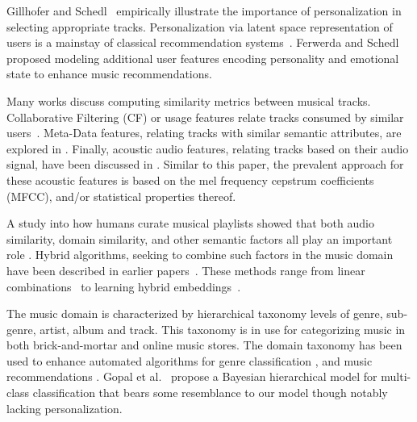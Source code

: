 Gillhofer and Schedl~\cite{Gillhofer2015} empirically illustrate the importance of personalization in selecting appropriate tracks. Personalization via latent space representation of users is a mainstay of classical recommendation systems~\cite{KorenBV09}. Ferwerda and Schedl~\cite{personalized_playlist_schedl} proposed modeling additional user features encoding personality and emotional state to enhance music recommendations.


Many works discuss computing similarity metrics between musical tracks. Collaborative Filtering (CF) or usage features relate tracks consumed by similar users~\cite{item2vec,Dror2011,Mcfee_learningsimilarity_CF}. Meta-Data features, relating tracks with similar semantic attributes, are explored in \cite{Bogdanov_content,  McfeeEtAl_2009_HeteEmbeForSubj, Pauws:ISMIR02,SlaneyEtAl_2008_LearAMetrFor}. Finally, acoustic audio features, relating tracks based on their audio signal, have been discussed in \cite{DoplerEtAl_2008_AcceMusiCollVia, Lee2011,a2mf}. Similar to this paper, the prevalent approach for these acoustic features is based on the mel frequency cepstrum coefficients (MFCC), and/or statistical properties thereof.

A study into how humans curate musical playlists showed that both audio similarity, domain similarity, and other semantic factors all play an important role \cite{Cunningham:06}. 
Hybrid algorithms, seeking to combine such factors in the music domain have been described in earlier papers~\cite{Knees:2006, Mcfee_learningsimilarity_CF,McFee_multi_similarities,Schedl:2015}. These methods range from linear combinations~\cite{Knees:2006} to learning hybrid embeddings~\cite{McFee_multi_similarities}.


The music domain is characterized by hierarchical taxonomy levels of genre, sub-genre, artist, album and track. This taxonomy is in use for categorizing music in both brick-and-mortar and online music stores. The domain taxonomy has been used to enhance automated algorithms for genre classification \cite{DecoroEtAl_2007_BayeAggrForHier}, and music recommendations \cite{Dror2011,Mnih2012}.
Gopal et al.~\cite{NIPS2012_4609} propose a Bayesian hierarchical model for multi-class classification that bears some resemblance to our model though notably lacking personalization.


